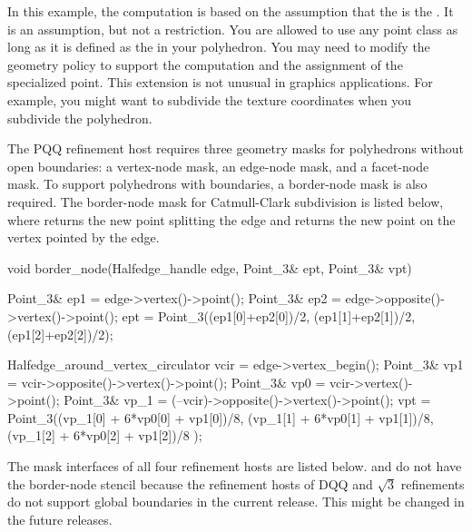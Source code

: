 In this example, the computation is based on the assumption that
the  is the . It is an assumption, 
but not a restriction.
You are allowed to use any point class as long as it is
defined as the  in your polyhedron.
You may need to modify the geometry policy to support the computation
and the assignment of the specialized point. This extension is not unusual 
in graphics applications. For example, you might want to subdivide the
texture coordinates when you subdivide the polyhedron. 

The PQQ refinement host requires three geometry masks for 
polyhedrons without open boundaries: a vertex-node 
mask, an edge-node mask, and a facet-node mask. 
To support polyhedrons with boundaries, a border-node mask is 
also required. The border-node mask for Catmull-Clark subdivision
is listed below, where  returns the new point splitting the
edge and  returns the new point on the vertex pointed by
the edge.  


\begin{ccExampleCode}
  void border_node(Halfedge_handle edge, Point_3& ept, Point_3& vpt) {
    Point_3& ep1 = edge->vertex()->point();
    Point_3& ep2 = edge->opposite()->vertex()->point();
    ept = Point_3((ep1[0]+ep2[0])/2, (ep1[1]+ep2[1])/2, (ep1[2]+ep2[2])/2);

    Halfedge_around_vertex_circulator vcir = edge->vertex_begin();
    Point_3& vp1  = vcir->opposite()->vertex()->point();
    Point_3& vp0  = vcir->vertex()->point();
    Point_3& vp_1 = (--vcir)->opposite()->vertex()->point();
    vpt = Point_3((vp_1[0] + 6*vp0[0] + vp1[0])/8,
                  (vp_1[1] + 6*vp0[1] + vp1[1])/8,
                  (vp_1[2] + 6*vp0[2] + vp1[2])/8 );
  }
\end{ccExampleCode}


The mask interfaces of all four refinement hosts are listed below.
 and  
do not have the border-node stencil because the refinement hosts of
DQQ and $\sqrt{3}$ refinements do not support global boundaries in the 
current release. This might be changed in the future releases.

